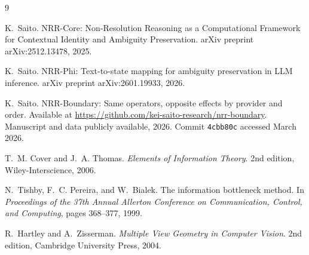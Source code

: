 \documentclass[11pt,a4paper]{article}
\begin{document}
\begin{thebibliography}{9}

K.~Saito.
\newblock NRR-Core: Non-Resolution Reasoning as a Computational Framework for Contextual Identity and Ambiguity Preservation.
\newblock arXiv preprint arXiv:2512.13478, 2025.

K.~Saito.
\newblock NRR-Phi: Text-to-state mapping for ambiguity preservation in LLM inference.
\newblock arXiv preprint arXiv:2601.19933, 2026.

K.~Saito.
\newblock NRR-Boundary: Same operators, opposite effects by provider and order.
\newblock Available at \url{https://github.com/kei-saito-research/nrr-boundary}. Manuscript and data publicly available, 2026. Commit \texttt{4cbb80c} accessed March 2026.

T.~M. Cover and J.~A. Thomas.
\newblock \emph{Elements of Information Theory}.
\newblock 2nd edition, Wiley-Interscience, 2006.

N.~Tishby, F.~C. Pereira, and W.~Bialek.
\newblock The information bottleneck method.
\newblock In \emph{Proceedings of the 37th Annual Allerton Conference on Communication, Control, and Computing}, pages 368--377, 1999.

R.~Hartley and A.~Zisserman.
\newblock \emph{Multiple View Geometry in Computer Vision}.
\newblock 2nd edition, Cambridge University Press, 2004.

\end{thebibliography}
\end{document}

